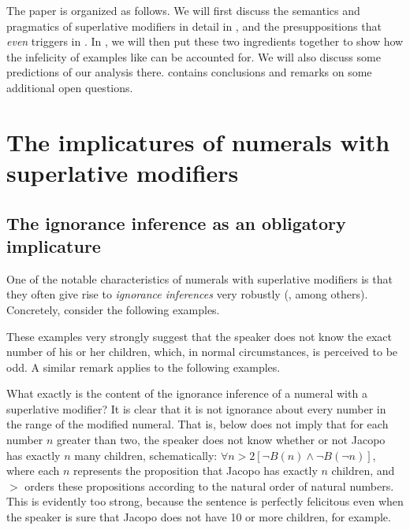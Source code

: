 \documentclass[output=paper]{langscibook}
\begin{document}
The paper is organized as follows. We will first discuss the semantics and pragmatics of superlative modifiers in detail in , and the presuppositions that \textit{even} triggers in . In , we will then put these two ingredients together to show how the infelicity of examples like  can be accounted for. We will also discuss some predictions of our analysis there.  contains conclusions and remarks on some additional open questions.


\section{The implicatures of numerals with superlative modifiers}
\label{don-sud:sec:ignorance}

\subsection{The ignorance inference as an obligatory implicature}

One of the notable characteristics of numerals with superlative modifiers is that they often give rise to \textit{ignorance inferences} very robustly (\citealt{krifka, buring, geurts-nouwen}, among others). Concretely, consider the following examples.

    \ea
        \begin{xlist}
        \end{xlist}
    \z

\noindent These examples very strongly suggest that the speaker does not know the exact number of his or her children, which, in normal circumstances, is perceived to be odd. A similar remark applies to the following examples.

    \ea
        \begin{xlist}
        \end{xlist}
    \z

\noindent What exactly is the content of the ignorance inference of a numeral with a superlative modifier? It is clear that it is not ignorance about every number in the range of the modified numeral. That is,  below does not imply that for each number $n$ greater than two, the speaker does not know whether or not Jacopo has exactly $n$ many children, schematically: $\forall n> 2 [\neg B(n) \land \neg B(\neg n)]$, where each $n$ represents the proposition that Jacopo has exactly $n$ children, and $>$ orders these propositions according to the natural order of natural numbers. This is evidently too strong, because the sentence is perfectly felicitous even when the speaker is sure that Jacopo does not have 10 or more children, for example.
\end{document}
